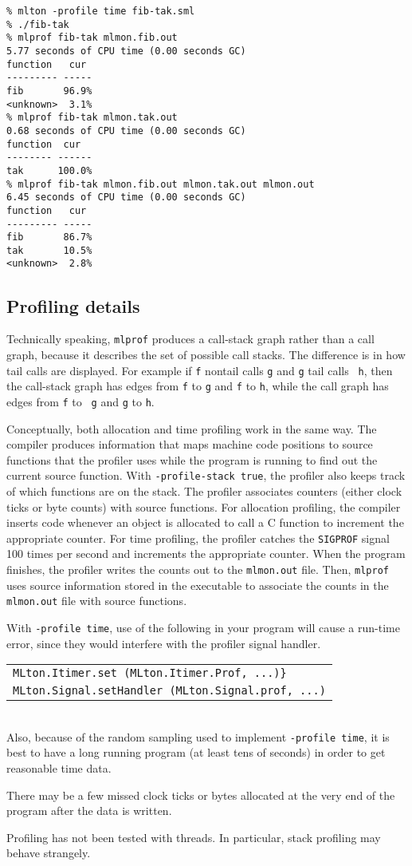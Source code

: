 \begin{verbatim}
% mlton -profile time fib-tak.sml
% ./fib-tak
% mlprof fib-tak mlmon.fib.out
5.77 seconds of CPU time (0.00 seconds GC)
function   cur 
--------- -----
fib       96.9%
<unknown>  3.1%
% mlprof fib-tak mlmon.tak.out
0.68 seconds of CPU time (0.00 seconds GC)
function  cur  
-------- ------
tak      100.0%
% mlprof fib-tak mlmon.fib.out mlmon.tak.out mlmon.out
6.45 seconds of CPU time (0.00 seconds GC)
function   cur 
--------- -----
fib       86.7%
tak       10.5%
<unknown>  2.8%
\end{verbatim}
%
\subsection{Profiling details}

Technically speaking, {\tt mlprof} produces a call-stack graph rather
than a call graph, because it describes the set of possible call
stacks.  The difference is in how tail calls are displayed.  For
example if {\tt f} nontail calls {\tt g} and {\tt g} tail calls {\tt
h}, then the call-stack graph has edges from {\tt f} to {\tt g} and
{\tt f} to {\tt h}, while the call graph has edges from {\tt f} to {\tt
g} and {\tt g} to {\tt h}.

Conceptually, both allocation and time profiling work in the same way.
The compiler produces information that maps machine code positions to
source functions that the profiler uses while the program is running
to find out the current source function.  With {\tt -profile-stack
true}, the profiler also keeps track of which functions are on the
stack.  The profiler associates counters (either clock ticks or byte
counts) with source functions.  For allocation profiling, the compiler
inserts code whenever an object is allocated to call a C function to
increment the appropriate counter.  For time profiling, the profiler
catches the {\tt SIGPROF} signal 100 times per second and increments
the appropriate counter.  When the program finishes, the profiler
writes the counts out to the {\tt mlmon.out} file.  Then, {\tt mlprof}
uses source information stored in the executable to associate the
counts in the {\tt mlmon.out} file with source functions.

With {\tt -profile time}, use of the following in your program will
cause a run-time error, since they would interfere with the profiler
signal handler.\\
\begin{tabular}{l}
\tt MLton.Itimer.set (MLton.Itimer.Prof, ...)\}\\
\tt MLton.Signal.setHandler (MLton.Signal.prof, ...)
\end{tabular}\\
Also, because of the random sampling used to implement {\tt -profile
time}, it is best to have a long running program (at least tens of
seconds) in order to get reasonable time data.

There may be a few missed clock ticks or bytes allocated at the
very end of the program after the data is written.

Profiling has not been tested with threads.  In particular, stack
profiling may behave strangely.
